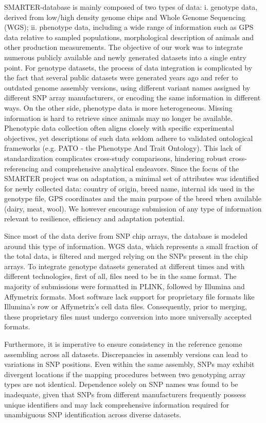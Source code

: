 \documentclass[a4paper,num-refs,gigabyte]{oup-contemporary}
\begin{document}
SMARTER-database is mainly composed of two types of data: i. genotype data, derived from low/high density genome chips and Whole Genome Sequencing (WGS); ii. phenotype data, including a wide range of information such as GPS data relative to sampled populations, morphological description of animals and other production measurements.
The objective of our work was to integrate numerous publicly available and newly generated datasets into a single entry point.
For genotype datasets, the process of data integration is complicated by the fact that several public datasets were generated years ago and refer to outdated genome assembly versions, using different variant names assigned by different SNP array manufacturers, or encoding the same information in different ways.
On the other side, phenotype data is more heterogeneous. Missing information is hard to retrieve since animals may no longer be available. Phenotypic data collection often aligns closely with specific experimental objectives, yet descriptions of such data seldom adhere to validated ontological frameworks (e.g. PATO - the Phenotype And Trait Ontology\citep{PATO}). This lack of standardization complicates cross-study comparisons, hindering robust cross-referencing and comprehensive analytical endeavors. Since the focus of the SMARTER project was on adaptation, a minimal set of attributes was identified for newly collected data: country of origin, breed name, internal ids used in the genotype file, GPS coordinates and the main purpose of the breed when available (dairy, meat, wool).  We however encourage submission of any type of information relevant to resilience, efficiency and adaptation potential.

Since most of the data derive from SNP chip arrays, the database is modeled around this type of information. WGS data, which represents a small fraction of the total data, is filtered and merged relying on the SNPs present in the chip arrays. To integrate genotype datasets generated at different times and with different technologies, first of all, files need to be in the same format. The majority of submissions were formatted in PLINK\citep{Purcell2007}, followed by Illumina and Affymetrix formats. Most software lack support for proprietary file formats like Illumina's row or Affymetrix's cell data files. Consequently, prior to merging, these proprietary files must undergo conversion into more universally accepted formats.

Furthermore, it is imperative to ensure consistency in the reference genome assembling across all datasets. Discrepancies in assembly versions can lead to variations in SNP positions. Even within the same assembly, SNPs may exhibit divergent locations if the mapping procedures between two genotyping array types are not identical\citep{Fadista2012,Gershoni2022}. Dependence solely on SNP names was found to be inadequate, given that SNPs from different manufacturers frequently possess unique identifiers and may lack comprehensive information required for unambiguous SNP identification across diverse datasets.
\end{document}
